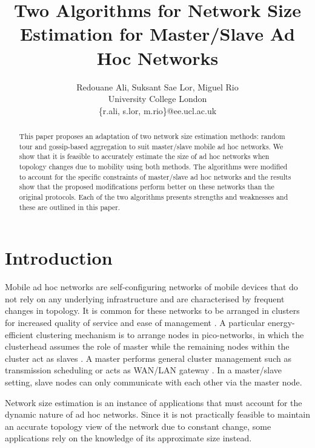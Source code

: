 \documentclass[twocolumn,10pt,conference]{IEEEtran}
\title{Two Algorithms for Network Size Estimation for Master/Slave Ad Hoc Networks}
\author{Redouane Ali, Suksant Sae Lor, Miguel Rio\\
University College London\\
\{r.ali, s.lor, m.rio\}@ee.ucl.ac.uk}
\begin{document}
\maketitle

\begin{abstract}
This paper proposes an adaptation of two network size estimation methods: random tour and gossip-based aggregation to suit  
master/slave mobile ad hoc networks. We show that it is feasible to accurately estimate the size of ad hoc networks when 
topology changes due to mobility using both methods. The algorithms were modified to account for the specific constraints 
of master/slave ad hoc networks and the results show that the proposed modifications perform better on these networks than 
the original protocols. Each of the two algorithms presents strengths and weaknesses and these are outlined in this paper. 
\end{abstract}

\section{Introduction}
Mobile ad hoc networks are self-configuring networks of mobile devices that do not rely on any underlying infrastructure and are characterised by frequent changes in topology. 
It is common for these networks to be arranged in clusters for increased quality of service and ease of management \cite{clustering_survey}. 
A particular energy-efficient clustering mechanism is to arrange nodes in pico-networks, in which the clusterhead assumes the role of master while the remaining nodes within the cluster act as slaves \cite{master_slave}. A master performs general cluster management such as transmission scheduling \cite{bluetooth} or acts as WAN/LAN gateway \cite{802_master_slave}. In a master/slave setting, slave nodes can only communicate with each other via the master node.

Network size estimation is an instance of applications that must account for the dynamic nature of ad hoc networks. Since it 
is not practically feasible to maintain an accurate topology view of the network due to constant change, 
some applications rely on the knowledge of its approximate size instead. 
\end{document}
